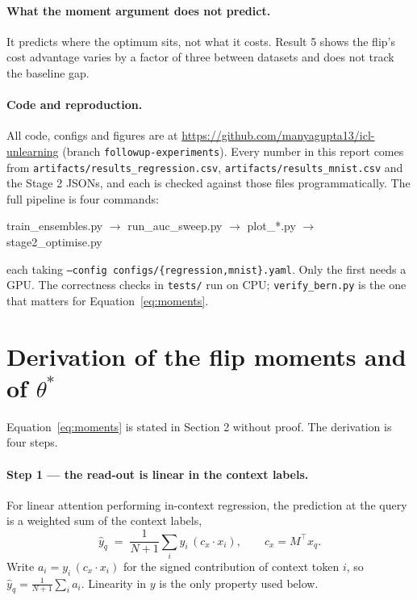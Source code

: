 \documentclass[11pt,a4paper]{article}
\begin{document}
\paragraph{What the moment argument does not predict.} It predicts where the
optimum sits, not what it costs. Result 5 shows the flip's cost advantage
varies by a factor of three between datasets and does not track the baseline
gap.

\paragraph{Code and reproduction.} All code, configs and figures are at
\url{https://github.com/manyagupta13/icl-unlearning} (branch
\texttt{followup-experiments}). Every number in this report comes from
\texttt{artifacts/results\_regression.csv}, \texttt{artifacts/results\_mnist.csv}
and the Stage 2 JSONs, and each is checked against those files
programmatically. The full pipeline is four commands:
\begin{center}\small\ttfamily
train\_ensembles.py $\to$ run\_auc\_sweep.py $\to$ plot\_*.py $\to$ stage2\_optimise.py
\end{center}
each taking \texttt{--config configs/\{regression,mnist\}.yaml}. Only the first
needs a GPU. The correctness checks in \texttt{tests/} run on CPU;
\texttt{verify\_bern.py} is the one that matters for
Equation~\eqref{eq:moments}.

\clearpage
\appendix
\section{Derivation of the flip moments and of $\theta^*$}
\label{app:deriv}

Equation~\eqref{eq:moments} is stated in Section 2 without proof. The
derivation is four steps.

\paragraph{Step 1 --- the read-out is linear in the context labels.} For linear
attention performing in-context regression, the prediction at the query is a
weighted sum of the context labels,
\[
\hat y_q \;=\; \frac{1}{N+1}\sum_i y_i\,(c_x\!\cdot\! x_i),
\qquad c_x = M^{\!\top} x_q .
\]
Write $a_i = y_i\,(c_x\!\cdot\!x_i)$ for the signed contribution of context
token $i$, so $\hat y_q = \frac{1}{N+1}\sum_i a_i$. Linearity in $y$ is the
only property used below.
\end{document}
